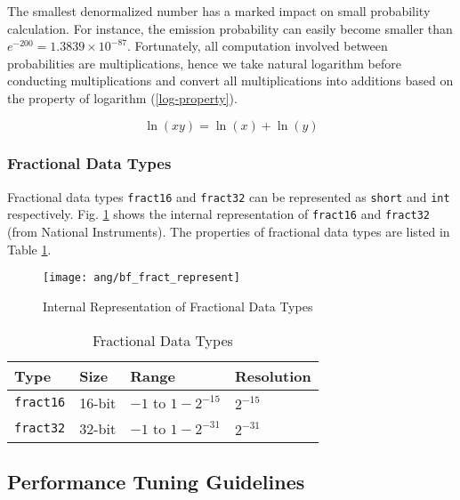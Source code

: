 The smallest denormalized number has a marked impact on small probability calculation. For instance, the emission probability can easily become smaller than $e^{-200} = 1.3839 \times 10^{-87}$. Fortunately, all computation involved between probabilities are multiplications, hence we take natural logarithm before conducting multiplications and convert all multiplications into additions based on the property of logarithm (\ref{log-property}).

\begin{equation}
\label{log-property}
\ln(xy) = \ln(x) + \ln(y)
\end{equation}


\subsubsection{Fractional Data Types}

Fractional data types \texttt{fract16} and \texttt{fract32} can be represented as \texttt{short} and \texttt{int} respectively. Fig. \ref{bf_fract_represent} shows the internal representation of \texttt{fract16} and \texttt{fract32} (from National Instruments). The properties of fractional data types are listed in Table \ref{fractional-data-types}.

\begin{figure}[H]
\centering
\texttt{[image: ang/bf\_fract\_represent]}
\caption{Internal Representation of Fractional Data Types}
\label{bf_fract_represent}
\end{figure}

\begin{table}[H]
\centering
\begin{tabu} to \textwidth {XXXX}
\toprule
Type &Size &Range &Resolution\\
\hline
\texttt{fract16} &16-bit &$-1$ to $1 - 2^{-15}$ &$2^{-15}$\\
\hline
\texttt{fract32} &32-bit &$-1$ to $1 - 2^{-31}$ &$2^{-31}$\\
\bottomrule
\end{tabu}
\caption{Fractional Data Types}
\label{fractional-data-types}
\end{table}


\subsection{Performance Tuning Guidelines}

